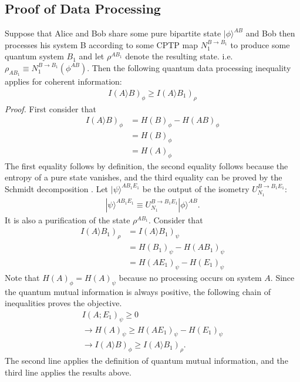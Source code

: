 \subsection{Proof of Data Processing}
Suppose that Alice and Bob share some pure bipartite state $|\phi \rangle ^{AB}$ and 
Bob then processes his system B according to some CPTP map $N_1^{B\to B_1}$ to produce some quantum system $B_1$ and let $\rho ^{AB_1}$ denote the resulting state. i.e.
$\rho_{AB_1} \equiv N_1^{B\to B_1}(\phi ^{AB})$. Then the following quantum data processing inequality applies for coherent information:
\begin{align*}
I(A\rangle B)_{\phi} \geq I(A\rangle B_1)_{\rho}
\end{align*}
\textit{Proof.} First consider that
\begin{align*}
I(A\rangle B)_{\phi} &= H(B)_\phi -H(AB)_\phi \\
&=H(B)_\phi \\
&=H(A)_\phi
\end{align*}
The first equality follows by definition, the second equality follows because the entropy of a pure state vanishes, and the third equality can be proved by the Schmidt decomposition \cite{CtoQ}. Let $|\psi \rangle ^{AB_1E_1}$ be the output of the isometry $U_{N_1}^{B \to B_1E_1}$:
\begin{align*}
|\psi \rangle ^{AB_1E_1} \equiv U_{N_1}^{B \to B_1E_1}|\phi \rangle ^{AB}.
\end{align*}
It is also a purification of the state $\rho ^{AB_1}$. Consider that
\begin{align*}
I(A \rangle B_1)_\rho &= I(A \rangle B_1)_\psi \\
&=H(B_1)_\psi - H(AB_1)_\psi \\
&=H(AE_1)_\psi - H(E_1)_\psi
\end{align*}
Note that $H(A)_\phi = H(A)_\psi$ because no processing occurs on system $A$. Since the quantum mutual information is always positive, the following chain of inequalities proves the objective.
\begin{align*}
I(A;E_1)_\psi \geq 0 \\
\rightarrow H(A)_\psi \geq H(AE_1)_\psi - H(E_1)_\psi \\
\rightarrow I(A\rangle B)_\phi \geq I(A\rangle B_1)_\rho .
\end{align*}
The second line applies the definition of quantum mutual information, and the third line applies the results above.